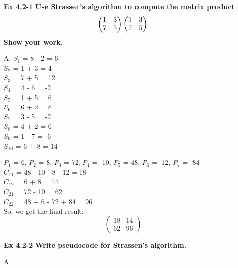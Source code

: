 \documentclass[fontsize=12pt,paper=a4,open=any]{book}
\begin{document}
\begin{enumerate}
	\item[\textbf{Ex 4.2-1}]
		\textbf{Use Strassen's algorithm to compute the matrix product\\
			\[			
			\begin{pmatrix}	1 & 3 \\ 7 & 5 \end{pmatrix}
			\begin{pmatrix}	1 & 3 \\ 7 & 5 \end{pmatrix}\\
			\]
		Show your work.}
	\item[A.]
		$S_1$ = 8 - 2 = 6\\
		$S_2$ = 1 + 3 = 4\\
		$S_3$ = 7 + 5 = 12\\
		$S_4$ = 4 - 6 = -2\\
		$S_5$ = 1 + 5 = 6\\
		$S_6$ = 6 + 2 = 8\\
		$S_7$ = 3 - 5 = -2\\
		$S_8$ = 4 + 2 = 6\\
		$S_9$ = 1 - 7 = -6\\
		$S_{10}$ = 6 + 8 = 14
		
		$P_1$ = 6, $P_2$ = 8, $P_3$ = 72, 
		$P_4$ = -10, $P_5$ = 48, $P_6$ = -12,
		$P_7$ = -84\\
		
		$C_{11}$ = 48 - 10 - 8 - 12 = 18 \\ 
		$C_{12}$ = 6 + 8 = 14 \\
		$C_{21}$ = 72 - 10 = 62 \\
		$C_{22}$ = 48 + 6 - 72 + 84 = 96 \\
		So, we get the final result:
		\[
		\begin{pmatrix} 18 & 14 \\ 62 & 96 \end{pmatrix}
		\]  
		
	\item[\textbf{Ex 4.2-2}]
		\textbf{Write pseudocode for Strassen’s algorithm.}
	\item[A.]
		\begin{algorithm}[H]
		

\end{algorithm}
\end{enumerate}
\end{document}
